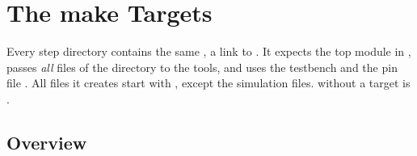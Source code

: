 \chapter{The make Targets}
\label{app:tools}

Every step directory contains the same , a link to
. It expects the top module  in
, passes \emph{all}  files of the directory to the tools,
and uses the testbench  and the pin file
. All files it creates start with , except the
simulation files.  without a target is .

\section{Overview}

